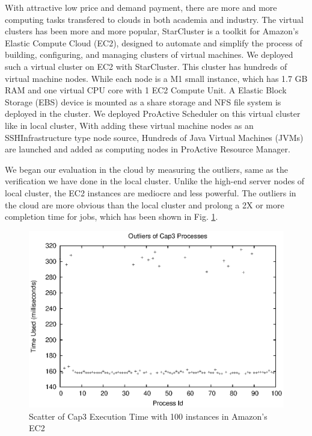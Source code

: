 With attractive low price and demand payment, there are more and more computing tasks transfered to clouds in both academia and industry. The virtual clusters has been more and more popular, StarCluster \cite{starcluster} is a toolkit for Amazon’s Elastic Compute Cloud (EC2), designed to automate and simplify the process of building, configuring, and managing clusters of virtual machines. We deployed such a virtual cluster on EC2 with StarCluster. This cluster has hundreds of virtual machine nodes. While each node is a M1 small instance, which has 1.7 GB RAM and one virtual CPU core with 1 EC2 Compute Unit. A Elastic Block Storage (EBS) device is mounted as a share storage and  NFS file system is deployed in the cluster. We deployed ProActive Scheduler on this virtual cluster like in local cluster, With adding these virtual machine nodes as an SSHInfrastructure type node source, Hundreds of Java Virtual Machines (JVMs) are launched and added as computing nodes in ProActive Resource Manager.

We began our evaluation in the cloud by measuring the outliers, same as the verification we have done in the local cluster. Unlike the high-end server nodes of local cluster, the EC2 instances are mediocre and less powerful. The outliers in the cloud are more obvious than the local cluster and prolong a 2X or more completion time for jobs, which has been shown in Fig. \ref{figure:outlier_cloud}.

\begin{figure}
\centering
\includegraphics[width=0.9\columnwidth]{figures/cloud_outliers.eps}
\caption{Scatter of Cap3 Execution Time with 100 instances in Amazon's EC2}
\label{figure:outlier_cloud}
\end{figure}

